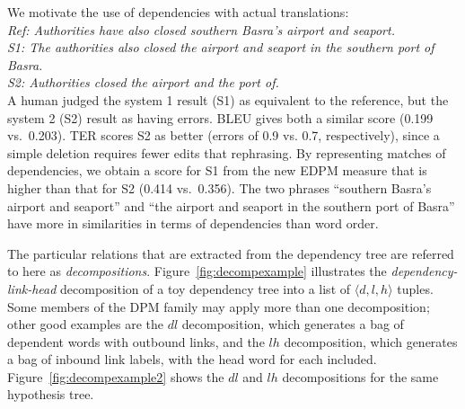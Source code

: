 \documentclass{kluwer}    %
\begin{document}
\begin{article}
We motivate the use of dependencies with actual translations:\\[4pt]
{\sl
Ref: Authorities have also closed southern Basra's airport and seaport.\\
S1: The authorities also closed the airport and seaport in the
southern port of Basra.\\
S2: Authorities closed the airport and the port of.\\[4pt]
}
A human judged the system 1 result (S1) as equivalent to the reference, but the system 2 (S2) result as
having errors.  BLEU gives both a similar score (0.199
vs.\ 0.203). TER scores S2 as better (errors
of 0.9 vs.  0.7, respectively), since a simple deletion requires fewer
edits that rephrasing.  By representing matches of dependencies, we
obtain a score for S1 from the new EDPM measure that is higher than
that for S2 (0.414 vs.\ 0.356).  The two phrases ``southern Basra's
airport and seaport'' and ``the airport and seaport in the southern
port of Basra'' have more in similarities in terms of dependencies
than word order.

The particular relations that are extracted from the dependency tree
are referred to here as \emph{decompositions}.
Figure~\ref{fig:decompexample}
illustrates the \emph{dependency-link-head} decomposition of a toy
dependency tree into a list of $\langle d, l, h \rangle$ tuples.  Some
members of the DPM family may apply more than one decomposition; other
good examples are the $dl$ decomposition, which generates a bag of
dependent words with outbound links, and the $lh$ decomposition, which
generates a bag of inbound link labels, with the head word for each
included. Figure~\ref{fig:decompexample2} shows the $dl$ and $lh$
decompositions for the same hypothesis tree.



\end{article}
\end{document}
